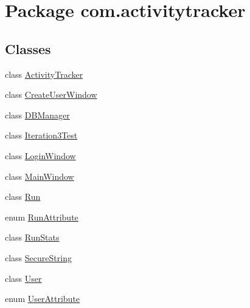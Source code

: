 \hypertarget{namespacecom_1_1activitytracker}{}\section{Package com.\+activitytracker}
\label{namespacecom_1_1activitytracker}
\subsection*{Classes}
\begin{DoxyCompactItemize}
\item 
class \mbox{\hyperlink{classcom_1_1activitytracker_1_1_activity_tracker}{Activity\+Tracker}}
\item 
class \mbox{\hyperlink{classcom_1_1activitytracker_1_1_create_user_window}{Create\+User\+Window}}
\item 
class \mbox{\hyperlink{classcom_1_1activitytracker_1_1_d_b_manager}{D\+B\+Manager}}
\item 
class \mbox{\hyperlink{classcom_1_1activitytracker_1_1_iteration3_test}{Iteration3\+Test}}
\item 
class \mbox{\hyperlink{classcom_1_1activitytracker_1_1_login_window}{Login\+Window}}
\item 
class \mbox{\hyperlink{classcom_1_1activitytracker_1_1_main_window}{Main\+Window}}
\item 
class \mbox{\hyperlink{classcom_1_1activitytracker_1_1_run}{Run}}
\item 
enum \mbox{\hyperlink{enumcom_1_1activitytracker_1_1_run_attribute}{Run\+Attribute}}
\item 
class \mbox{\hyperlink{classcom_1_1activitytracker_1_1_run_stats}{Run\+Stats}}
\item 
class \mbox{\hyperlink{classcom_1_1activitytracker_1_1_secure_string}{Secure\+String}}
\item 
class \mbox{\hyperlink{classcom_1_1activitytracker_1_1_user}{User}}
\item 
enum \mbox{\hyperlink{enumcom_1_1activitytracker_1_1_user_attribute}{User\+Attribute}}
\end{DoxyCompactItemize}
